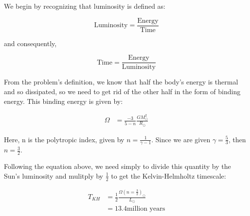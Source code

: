 \documentclass[12pt]{article}
\newenvironment{answer}[2][Answer]{\begin{trivlist}
\item[\hskip \labelsep {\bfseries #1}\hskip \labelsep {\bfseries #2.}]}{\end{trivlist}}
\begin{document}
\begin{answer}{2}

We begin by recognizing that luminosity is defined as:

$$ \text{Luminosity} = \frac{\text{Energy}}{\text{Time}} $$
\bigskip

and consequently,

$$ \text{Time} = \frac{\text{Energy}}{\text{Luminosity}} $$
\bigskip

From the problem's definition, we know that half the body's energy is thermal and so dissipated, so we need to get rid of the other half in the form of binding energy. This binding energy is given by:


\begin{align*}
  \Omega &= \frac{-3}{5-n}  \frac{G M_{\odot}^{2}}{R_{\odot}}
\end{align*}
\bigskip

Here, n is the polytropic index, given by $n = \frac{1}{\gamma - 1}$. Since we are given $\gamma = \frac{5}{3}$, then $n = \frac{3}{2}$.


Following the equation above, we need simply to divide this quantity by the Sun's luminosity and mulitply by $\frac{1}{2}$ to get the Kelvin-Helmholtz timescale:

\begin{align*}
  T_{KH} &= \frac{1}{2} \frac{\Omega(n=\frac{3}{2})_\odot}{L_{\odot}} \\
         &= 13.4 \text{million years}
\end{align*}





\end{answer}
\end{document}

